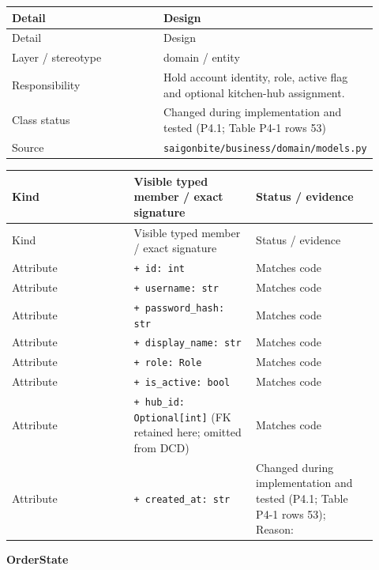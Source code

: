 \begin{longtable}{>{\raggedright\arraybackslash}p{0.4600\linewidth}>{\raggedright\arraybackslash}p{0.4600\linewidth}}
Detail & Design \\
\hline\endfirsthead
Detail & Design \\
\hline\endhead
Layer / stereotype & domain / \guillemotleft{}entity\guillemotright{} \\
Responsibility & Hold account identity, role, active flag and optional kitchen-hub assignment. \\
Class status & Changed during implementation and tested (P4.1; Table P4-1 rows 53) \\
Source & \texttt{saigonbite/\allowbreak{}business/\allowbreak{}domain/\allowbreak{}models.\allowbreak{}py} \\
\end{longtable}
\begin{longtable}{>{\raggedright\arraybackslash}p{0.3067\linewidth}>{\raggedright\arraybackslash}p{0.3067\linewidth}>{\raggedright\arraybackslash}p{0.3067\linewidth}}
Kind & Visible typed member / exact signature & Status / evidence \\
\hline\endfirsthead
Kind & Visible typed member / exact signature & Status / evidence \\
\hline\endhead
Attribute & \texttt{+ id: int} & Matches code \\
Attribute & \texttt{+ username: str} & Matches code \\
Attribute & \texttt{+ password\_\allowbreak{}hash: str} & Matches code \\
Attribute & \texttt{+ display\_\allowbreak{}name: str} & Matches code \\
Attribute & \texttt{+ role: Role} & Matches code \\
Attribute & \texttt{+ is\_\allowbreak{}active: bool} & Matches code \\
Attribute & \texttt{+ hub\_\allowbreak{}id: Optional[int]} (FK retained here; omitted from DCD) & Matches code \\
Attribute & \texttt{+ created\_\allowbreak{}at: str} & Changed during implementation and tested (P4.1; Table P4-1 rows 53); Reason: \\
\end{longtable}
\textbf{OrderState}

